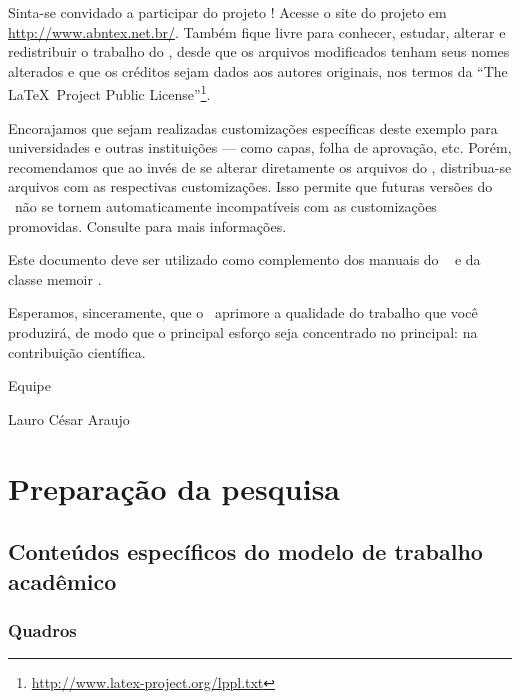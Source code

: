 \documentclass[
	12pt,				%
	openright,			%
	twoside,			%
	a4paper,			%
	english,			%
	french,				%
	spanish,			%
	brazil				%
	]{abntex2}
\begin{document}
Sinta-se convidado a participar do projeto \abnTeX! Acesse o site do projeto em
\url{http://www.abntex.net.br/}. Também fique livre para conhecer,
estudar, alterar e redistribuir o trabalho do \abnTeX, desde que os arquivos
modificados tenham seus nomes alterados e que os créditos sejam dados aos
autores originais, nos termos da ``The \LaTeX\ Project Public
License''\footnote{\url{http://www.latex-project.org/lppl.txt}}.

Encorajamos que sejam realizadas customizações específicas deste exemplo para
universidades e outras instituições --- como capas, folha de aprovação, etc.
Porém, recomendamos que ao invés de se alterar diretamente os arquivos do
\abnTeX, distribua-se arquivos com as respectivas customizações.
Isso permite que futuras versões do \abnTeX~não se tornem automaticamente
incompatíveis com as customizações promovidas. Consulte
 para mais informações.

Este documento deve ser utilizado como complemento dos manuais do \abnTeX\ 
\cite{abntex2classe,abntex2cite,abntex2cite-alf} e da classe \textsf{memoir}
\cite{memoir}. 

Esperamos, sinceramente, que o \abnTeX\ aprimore a qualidade do trabalho que
você produzirá, de modo que o principal esforço seja concentrado no principal:
na contribuição científica.

Equipe \abnTeX 

Lauro César Araujo

\part{Preparação da pesquisa}



\chapter{Conteúdos específicos do modelo de trabalho acadêmico}\label{cap_trabalho_academico}

\section{Quadros}
\end{document}
